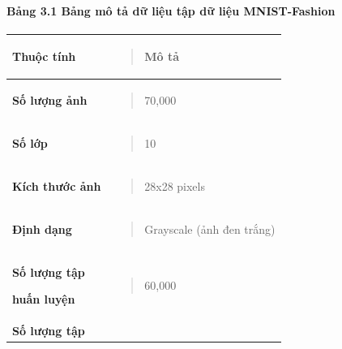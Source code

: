 \documentclass[
]{article}
\newcounter{none} %
\begin{document}
\paragraph{Bảng 3.1 Bảng mô tả dữ liệu tập dữ liệu
MNIST-Fashion}\label{bux1ea3ng-3.1-bux1ea3ng-muxf4-tux1ea3-dux1eef-liux1ec7u-tux1eadp-dux1eef-liux1ec7u-mnist-fashion}

{\def\LTcaptype{none} %
\begin{longtable}[]{@{}
  >{\raggedright\arraybackslash}p{}
  >{\raggedright\arraybackslash}p{}@{}}
\toprule\noalign{}
\begin{minipage}[b]{\linewidth}\raggedright
\textbf{Thuộc tính}
\end{minipage} & \begin{minipage}[b]{\linewidth}\raggedright
\begin{quote}
\textbf{Mô tả}
\end{quote}
\end{minipage} \\
\midrule\noalign{}
\endhead
\bottomrule\noalign{}
\endlastfoot
\textbf{Số lượng ảnh} & \begin{minipage}[t]{\linewidth}\raggedright
\begin{quote}
70,000
\end{quote}
\end{minipage} \\
\textbf{Số lớp} & \begin{minipage}[t]{\linewidth}\raggedright
\begin{quote}
10
\end{quote}
\end{minipage} \\
\textbf{Kích thước ảnh} & \begin{minipage}[t]{\linewidth}\raggedright
\begin{quote}
28x28 pixels
\end{quote}
\end{minipage} \\
\textbf{Định dạng} & \begin{minipage}[t]{\linewidth}\raggedright
\begin{quote}
Grayscale (ảnh đen trắng)
\end{quote}
\end{minipage} \\
\textbf{Số lượng tập}

\textbf{huấn luyện} & \begin{minipage}[t]{\linewidth}\raggedright
\begin{quote}
60,000
\end{quote}
\end{minipage} \\
\textbf{Số lượng tập}


\end{longtable}}
\end{document}
